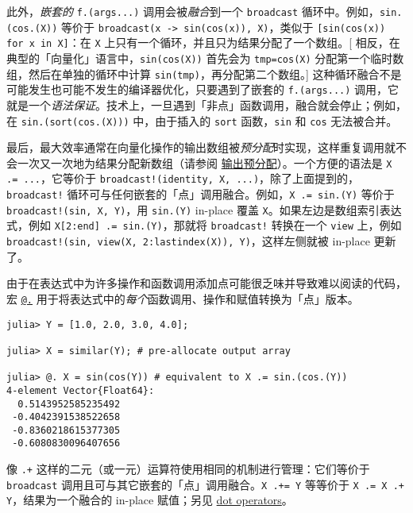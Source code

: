 此外，\emph{嵌套的} \texttt{f.(args...)} 调用会被\emph{融合}到一个 \texttt{broadcast} 循环中。例如，\texttt{sin.(cos.(X))} 等价于 \texttt{broadcast(x -> sin(cos(x)), X)}，类似于 \texttt{[sin(cos(x)) for x in X]}：在 \texttt{X} 上只有一个循环，并且只为结果分配了一个数组。[ 相反，在典型的「向量化」语言中，\texttt{sin(cos(X))} 首先会为 \texttt{tmp=cos(X)} 分配第一个临时数组，然后在单独的循环中计算 \texttt{sin(tmp)}，再分配第二个数组。] 这种循环融合不是可能发生也可能不发生的编译器优化，只要遇到了嵌套的 \texttt{f.(args...)} 调用，它就是一个\emph{语法保证}。技术上，一旦遇到「非点」函数调用，融合就会停止；例如，在 \texttt{sin.(sort(cos.(X)))} 中，由于插入的 \texttt{sort} 函数，\texttt{sin} 和 \texttt{cos} 无法被合并。



最后，最大效率通常在向量化操作的输出数组被\emph{预分配}时实现，这样重复调用就不会一次又一次地为结果分配新数组（请参阅 \href{@ref}{输出预分配}）。一个方便的语法是 \texttt{X .= ...}，它等价于 \texttt{broadcast!(identity, X, ...)}，除了上面提到的，\texttt{broadcast!} 循环可与任何嵌套的「点」调用融合。例如，\texttt{X .= sin.(Y)} 等价于 \texttt{broadcast!(sin, X, Y)}，用 \texttt{sin.(Y)} in-place 覆盖 \texttt{X}。如果左边是数组索引表达式，例如 \texttt{X[2:end] .= sin.(Y)}，那就将 \texttt{broadcast!} 转换在一个 \texttt{view} 上，例如 \texttt{broadcast!(sin, view(X, 2:lastindex(X)), Y)}，这样左侧就被 in-place 更新了。



由于在表达式中为许多操作和函数调用添加点可能很乏味并导致难以阅读的代码，宏 \hyperlink{16688502228717894452}{\texttt{@.}} 用于将表达式中的\emph{每个}函数调用、操作和赋值转换为「点」版本。




\begin{verbatim}
julia> Y = [1.0, 2.0, 3.0, 4.0];

julia> X = similar(Y); # pre-allocate output array

julia> @. X = sin(cos(Y)) # equivalent to X .= sin.(cos.(Y))
4-element Vector{Float64}:
  0.5143952585235492
 -0.4042391538522658
 -0.8360218615377305
 -0.6080830096407656
\end{verbatim}



像 \texttt{.+} 这样的二元（或一元）运算符使用相同的机制进行管理：它们等价于 \texttt{broadcast} 调用且可与其它嵌套的「点」调用融合。\texttt{X .+= Y} 等等价于 \texttt{X .= X .+ Y}，结果为一个融合的 in-place 赋值；另见 \hyperlink{15967322336376951940}{dot operators}。



